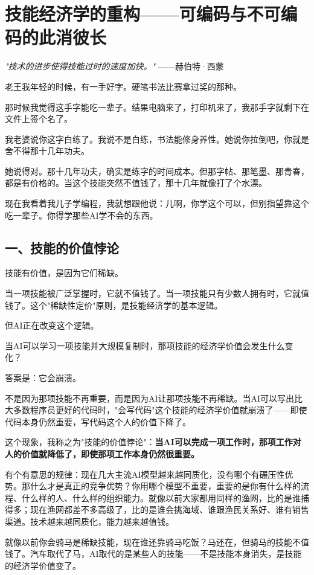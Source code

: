 \chapter{技能经济学的重构——可编码与不可编码的此消彼长}


\textit{"技术的进步使得技能过时的速度加快。"}
——赫伯特·西蒙


老王我年轻的时候，有一手好字。硬笔书法比赛拿过奖的那种。

那时候我觉得这手字能吃一辈子。结果电脑来了，打印机来了，我那手字就剩下在文件上签个名了。

我老婆说你这字白练了。我说不是白练，书法能修身养性。她说你拉倒吧，你就是舍不得那十几年功夫。

她说得对。那十几年功夫，确实是练字的时间成本。但那字帖、那笔墨、那青春，都是有价格的。当这个技能突然不值钱了，那十几年就像打了个水漂。

现在我看着我儿子学编程，我就想跟他说：儿啊，你学这个可以，但别指望靠这个吃一辈子。你得学那些AI学不会的东西。

\section{一、技能的价值悖论}


技能有价值，是因为它们稀缺。

当一项技能被广泛掌握时，它就不值钱了。当一项技能只有少数人拥有时，它就值钱了。这个"稀缺性定价"原则，是技能经济学的基本逻辑。

但AI正在改变这个逻辑。

当AI可以学习一项技能并大规模复制时，那项技能的经济学价值会发生什么变化？

答案是：它会崩溃。

不是因为那项技能不再重要，而是因为AI让那项技能不再稀缺。当AI可以写出比大多数程序员更好的代码时，"会写代码"这个技能的经济学价值就崩溃了——即使代码本身仍然重要，写代码这个人的价值下降了。

这个现象，我称之为"技能的价值悖论"：\textbf{当AI可以完成一项工作时，那项工作对人的价值就降低了，即使那项工作本身仍然很重要。}

有个有意思的规律：现在几大主流AI模型越来越同质化，没有哪个有碾压性优势。那什么才是真正的竞争优势？你用哪个模型不重要，重要的是你有什么样的流程、什么样的人、什么样的组织能力。就像以前大家都用同样的渔网，比的是谁捕得多；现在渔网都差不多高级了，比的是谁会挑海域、谁跟渔民关系好、谁有销售渠道。技术越来越同质化，能力越来越值钱。

就像以前你会骑马是稀缺技能，现在谁还靠骑马吃饭？马还在，但骑马的技能不值钱了。汽车取代了马，AI取代的是某些人的技能——不是技能本身消失，是技能的经济学价值变了。

